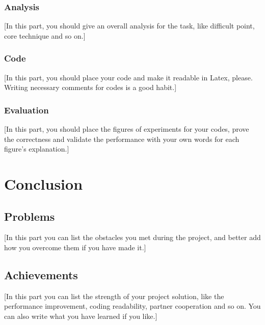 \documentclass{article}
\begin{document}
\subsubsection{Analysis}

[In this part, you should give an overall analysis for the task, like difficult point, core technique and so on.]

\subsubsection{Code}

[In this part, you should place your code and make it readable in Latex, please. Writing necessary comments for codes is a good habit.]

\subsubsection{Evaluation}

[In this part, you should place the figures of experiments for your codes, prove the correctness and validate the performance with your own words for each figure’s explanation.]

\section{Conclusion}

\subsection{Problems}

[In this part you can list the obstacles you met during the project, and better add how you overcome them if you have made it.]

\subsection{Achievements}

[In this part you can list the strength of your project solution, like the performance improvement, coding readability, partner cooperation and so on. You can also write what you have learned if you like.]



\end{document}
